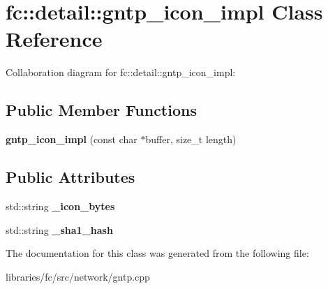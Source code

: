 \hypertarget{classfc_1_1detail_1_1gntp__icon__impl}{}\section{fc\+:\+:detail\+:\+:gntp\+\_\+icon\+\_\+impl Class Reference}
\label{classfc_1_1detail_1_1gntp__icon__impl}


Collaboration diagram for fc\+:\+:detail\+:\+:gntp\+\_\+icon\+\_\+impl\+:
\subsection*{Public Member Functions}
\begin{DoxyCompactItemize}
\item 
\mbox{\label{classfc_1_1detail_1_1gntp__icon__impl_a5f2d193019668ec353c8dd40f0e8da49}} 
{\bfseries gntp\+\_\+icon\+\_\+impl} (const char $\ast$buffer, size\+\_\+t length)
\end{DoxyCompactItemize}
\subsection*{Public Attributes}
\begin{DoxyCompactItemize}
\item 
\mbox{\label{classfc_1_1detail_1_1gntp__icon__impl_ac3ce9406a76835189b2f193b17567bcc}} 
std\+::string {\bfseries \+\_\+icon\+\_\+bytes}
\item 
\mbox{\label{classfc_1_1detail_1_1gntp__icon__impl_a007649f37bce851e9c122a999b6ecf62}} 
std\+::string {\bfseries \+\_\+sha1\+\_\+hash}
\end{DoxyCompactItemize}


The documentation for this class was generated from the following file\+:\begin{DoxyCompactItemize}
\item 
libraries/fc/src/network/gntp.\+cpp\end{DoxyCompactItemize}
